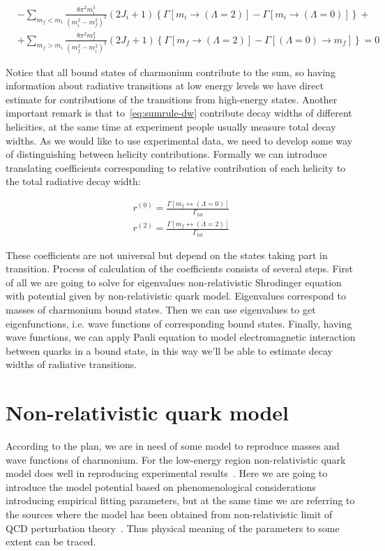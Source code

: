 \begin{align} \label{eq:sumrule-dw}
    &-\sum_{m_f < m_i} \frac{8 \pi^2 m_i^3}{(m_i^2 - m_f^2)^3} (2J_i+1) \left\{\Gamma\left[m_i \rightarrow (\Lambda = 2)\right] - \Gamma\left[m_i \rightarrow (\Lambda = 0)\right] \right\} + \nonumber \\
    &+ \sum_{m_f > m_i} \frac{8 \pi^2 m_f^3}{(m_f^2 - m_i^2)^3} (2J_f+1) \left\{\Gamma\left[m_f \rightarrow (\Lambda = 2)\right] - \Gamma\left[(\Lambda = 0) \rightarrow m_f\right] \right\} = 0
\end{align}

Notice that all bound states of charmonium contribute to the sum, so having information about radiative transitions at low energy levels we have direct estimate for contributions of the transitions from high-energy states. Another important remark is that to~\ref{eq:sumrule-dw} contribute decay widths of different helicities, at the same time at experiment people usually measure total decay widths. As we would like to use experimental data, we need to develop some way of distinguishing between helicity contributions. Formally we can introduce translating coefficients corresponding to relative contribution of each helicity to the total radiative decay width:

\begin{align}
    r^{(0)} = \frac{\Gamma\left[m_f \leftrightarrow (\Lambda=0)\right]}{\Gamma_{tot}} \\
    r^{(2)} = \frac{\Gamma\left[m_f \leftrightarrow (\Lambda=2)\right]}{\Gamma_{tot}}
\end{align}

These coefficients are not universal but depend on the states taking part in transition. Process of calculation of the coefficients consists of several steps. First of all we are going to solve for eigenvalues non-relativistic Shrodinger equation with potential given by non-relativistic quark model. Eigenvalues correspond to masses of charmonium bound states. Then we can use eigenvalues to get eigenfunctions, i.e. wave functions of corresponding bound states. Finally, having wave functions, we can apply Pauli equation to model electromagnetic interaction between quarks in a bound state, in this way we'll be able to estimate decay widths of radiative transitions.

\section{Non-relativistic quark model}
According to the plan, we are in need of some model to reproduce masses and wave functions of charmonium. For the low-energy region non-relativistic quark model does well in reproducing experimental results~\cite{deng-charm, deng-bot}. Here we are going to introduce the model potential based on phenomenological considerations introducing empirical fitting parameters, but at the same time we are referring to the sources where the model has been obtained from non-relativistic limit of QCD perturbation theory~\cite{nrqm-perturb}. Thus physical meaning of the parameters to some extent can be traced.

